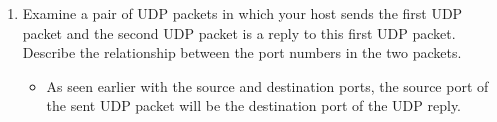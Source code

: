 \documentclass{article}
\begin{document}
\begin{enumerate}
    \item Examine a pair of UDP packets in which your host sends the first UDP packet and the second UDP packet is a reply to this first UDP packet.  Describe the relationship between
    the port numbers in the two packets.
        \begin{itemize}
          \item As seen earlier with the source and destination ports, the source port of the sent UDP packet will be the destination port of the UDP reply.   
        \end{itemize}
    \end{enumerate}
\end{document}
